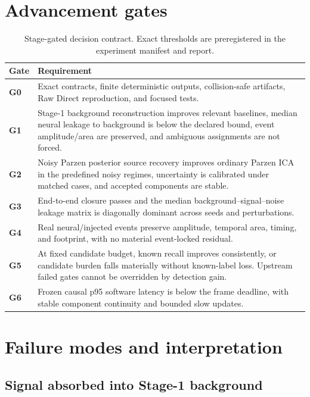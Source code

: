 \documentclass[11pt]{article}
\begin{document}
\section{Advancement gates}

\begin{table}[H]
\centering
\small
\caption{Stage-gated decision contract. Exact thresholds are preregistered in the
experiment manifest and report.}
\label{tab:gates}
\begin{tabularx}{\textwidth}{>{\bfseries}p{}X}
\toprule
Gate & Requirement \\
\midrule
G0 & Exact contracts, finite deterministic outputs, collision-safe artifacts,
Raw Direct reproduction, and focused tests. \\
G1 & Stage-1 background reconstruction improves relevant baselines, median neural
leakage to background is below the declared bound, event amplitude/area are
preserved, and ambiguous assignments are not forced. \\
G2 & Noisy Parzen posterior source recovery improves ordinary Parzen ICA in the
predefined noisy regimes, uncertainty is calibrated under matched cases, and
accepted components are stable. \\
G3 & End-to-end closure passes and the median background--signal--noise leakage
matrix is diagonally dominant across seeds and perturbations. \\
G4 & Real neural/injected events preserve amplitude, temporal area, timing, and
footprint, with no material event-locked residual. \\
G5 & At fixed candidate budget, known recall improves consistently, or candidate
burden falls materially without known-label loss. Upstream failed gates cannot be
overridden by detection gain. \\
G6 & Frozen causal p95 software latency is below the frame deadline, with stable
component continuity and bounded slow updates. \\
\bottomrule
\end{tabularx}
\end{table}

\section{Failure modes and interpretation}

\subsection{Signal absorbed into Stage-1 background}
\end{document}
